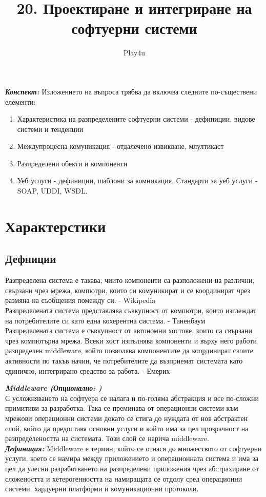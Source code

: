 \documentclass[11pt]{article} %
\title{20. Проектиране и интегриране на софтуерни системи}
\author{Play4u}
\newcommand{\italicBold}[1]{\textbf{\emph{#1}}}
\newcommand{\definition}{\italicBold{Дефиниция: }}
\newcommand{\enumNum}{\renewcommand{\theenumi}{\arabic{enumi}}}
\begin{document}
\maketitle

\italicBold{Конспект: } Изложението на въпроса трябва да включва следните по-съществени елементи:

\enumNum
\begin{enumerate}[noitemsep]
	\item Характеристика на разпределените софтуерни системи - дефиниции, видове системи и тенденции
	\item Междупроцесна комуникация - отдалечено извикване, млултикаст
	\item Разпределени обекти и компоненти
	\item Уеб услуги - дефиниции, шаблони за комникация. Стандарти за уеб услуги - SOAP, UDDI, WSDL.\\\par
\end{enumerate}


\section{Характерстики}
\subsection{Дефниции}
Разпределена система е такава, чиито компоненти са разположени на различни, свързани чрез мрежа, компютри, които си комуникират и се координират чрез размяна на съобщения помежду си. - Wikipedia\\
Разпределената система представлява съвкупност от компютри, които изглеждат на потребителите си като една кохерентна система. - Таненбаум\\
Разпределената система е съвкупност от автономни хостове, които са свързани чрез компютърна мрежа. Всеки хост изпълнява компоненти и върху него работи разпределен middleware, който позволява компонентите да координират своите активности по такъв начин, че потребителите да възприемат системата като единично, интегрирано средство за работа. - Емерих\\\par

\italicBold{Middleware (Опционално: )}\\
С усложняването на софтуера се налага и по-голяма абстракция и все по-сложни примитиви за разработка. Така се преминава от операционни системи към мрежови операционни системи докато се стига до нуждата от нов абстрактен слой, който да предоставя основни услуги и който има за цел прозрачност на разпределеността на системата. Този слой се нарича middleware.\\
\definition Middleware е термин, който се отнася до множеството от софтуерни услуги, което се намира между приложението и операционната система и има за цел да улесни разработването на разпределени приложения чрез абстрахиране от сложеността и хетерогенността на намиращата се отдолу сред операционни системи, хардуерни платформи и комуникационни протоколи.\\\par
\end{document}

